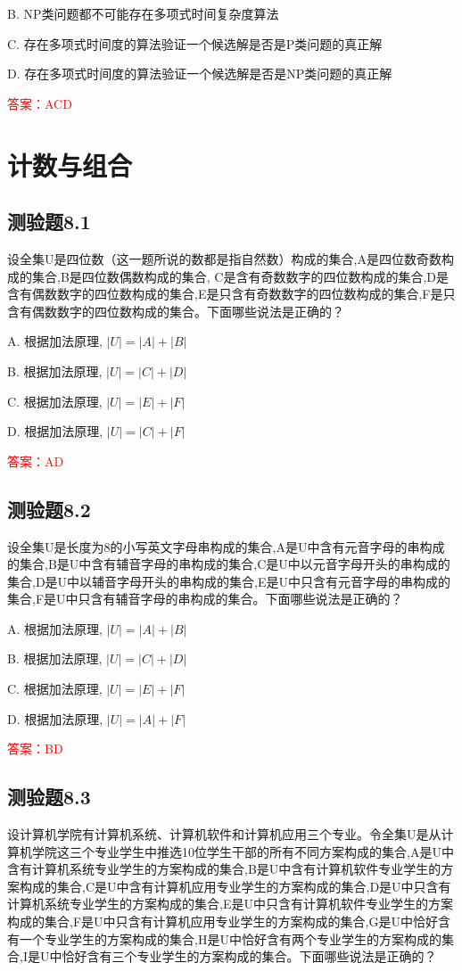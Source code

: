 \documentclass[UTF8, heading=true]{ctexart}
\begin{document}
B. NP类问题都不可能存在多项式时间复杂度算法

C. 存在多项式时间度的算法验证一个候选解是否是P类问题的真正解

D. 存在多项式时间度的算法验证一个候选解是否是NP类问题的真正解

\textcolor{red}{答案：ACD}

\clearpage
\section{计数与组合}

\subsection{测验题8.1}

设全集U是四位数（这一题所说的数都是指自然数）构成的集合,A是四位数奇数构成的集合,B是四位数偶数构成的集合,
C是含有奇数数字的四位数构成的集合,D是含有偶数数字的四位数构成的集合,E是只含有奇数数字的四位数构成的集合,F是只含有偶数数字的四位数构成的集合。下面哪些说法是正确的？

A. 根据加法原理, $|U|=|A|+|B|$

B. 根据加法原理, $|U|=|C|+|D|$

C. 根据加法原理, $|U|=|E|+|F|$

D. 根据加法原理, $|U|=|C|+|F|$

\textcolor{red}{答案：AD}

\subsection{测验题8.2}

设全集U是长度为8的小写英文字母串构成的集合,A是U中含有元音字母的串构成的集合,B是U中含有辅音字母的串构成的集合,C是U中以元音字母开头的串构成的集合,D是U中以辅音字母开头的串构成的集合,E是U中只含有元音字母的串构成的集合,F是U中只含有辅音字母的串构成的集合。下面哪些说法是正确的？

A. 根据加法原理, $|U|=|A|+|B|$

B. 根据加法原理, $|U|=|C|+|D|$

C. 根据加法原理, $|U|=|E|+|F|$

D. 根据加法原理, $|U|=|A|+|F|$

\textcolor{red}{答案：BD}

\subsection{测验题8.3}

设计算机学院有计算机系统、计算机软件和计算机应用三个专业。令全集U是从计算机学院这三个专业学生中推选10位学生干部的所有不同方案构成的集合,A是U中含有计算机系统专业学生的方案构成的集合,B是U中含有计算机软件专业学生的方案构成的集合,C是U中含有计算机应用专业学生的方案构成的集合,D是U中只含有计算机系统专业学生的方案构成的集合,E是U中只含有计算机软件专业学生的方案构成的集合,F是U中只含有计算机应用专业学生的方案构成的集合,G是U中恰好含有一个专业学生的方案构成的集合,H是U中恰好含有两个专业学生的方案构成的集合,I是U中恰好含有三个专业学生的方案构成的集合。下面哪些说法是正确的？
\end{document}

